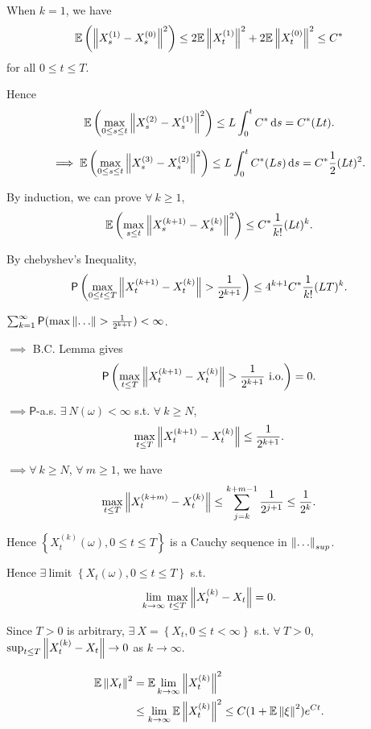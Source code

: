 {    When $k=1$, we have 
    $$
        \mathbb{E}\left( \left\|  X_s^{(1)} - X_s^{(0)}  \right\|^2 \right) \leq 2 \mathbb{E}\left\|  X_t^{(1)}  \right\|^2 + 2 \mathbb{E}\left\|  X_t^{(0)}  \right\|^2 \leq C^*
    $$
    for all $0 \leq t \leq T.$

    Hence 
    $$
    \mathbb{E}\left( \max_{0 \leq s \leq t} \left\|  X_s^{(2)} - X_s^{(1)}  \right\|^2 \right) \leq L\int_0^t C^* \mathop{}\!\mathrm{d} s = C^*(Lt).
    $$

    $$\implies
        \mathbb{E}\left( \max_{0 \leq s \leq t} \left\|  X_s^{(3)} - X_s^{(2)}  \right\|^2 \right) \leq L\int_0^t C^* (Ls) \mathop{}\!\mathrm{d} s = C^* \frac{1}{2}(Lt)^2.
    $$

    By induction, we can prove $\forall~ k \geq 1$,
    $$
    \mathbb{E}\left( \max_{s \leq t} \left\|  X_s^{(k+1)} - X_s^{(k)}  \right\|^2 \right) \leq C^* \frac{1}{k!} (Lt)^k.
    $$

    By chebyshev's Inequality,
    $$
    \mathsf{P}\left(\max_{0 \leq t \leq T} \left\|  X_t^{(k+1)} - X_t^{(k)}  \right\| > \frac{1}{2^{k+1}}\right) \leq 4^{k+1} C^* \frac{1}{k!} (LT)^k.
    $$

    $\sum_{k=1}^\infty \mathsf{P}(\max \norm{ \dots } > \frac{1}{2^{k+1}}) < \infty$.

    $\implies$ B.C. Lemma gives
    $$
    \mathsf{P}\left(\max_{t \leq T} \left\|  X_t^{(k+1)} - X_t^{(k)}  \right\| > \frac{1}{2^{k+1}}~\text{i.o.}\right) = 0.
    $$  

    $\implies \mathsf{P}$-a.s. $\exists~N(\omega)< \infty$ s.t. $\forall~ k \geq N$, 
    $$
        \max_{t \leq T} \left\|  X_t^{(k+1)} - X_t^{(k)}  \right\|\leq \frac{1}{2^{k+1}}.
    $$

    $\implies \forall~ k \geq N$, $\forall~ m \geq 1$, we have
    $$
    \max_{t \leq T} \left\|  X_t^{(k+m)} - X_t^{(k)}  \right\| \leq\sum_{j=k}^{k+m-1} \frac{1}{2^{j+1}} \leq \frac{1}{2^k}.
    $$
    
    Hence $\left\{ X_t^{(k)}(\omega),0 \leq t \leq T \right\}$ is a Cauchy sequence in $\norm{ \dots }_{sup}$.

    Hence $\exists~$limit $\left\{ X_t(\omega), 0 \leq t \leq T \right\}$ s.t. 
    $$
    \lim_{k\to \infty} \max_{t \leq T} \left\|  X_t^{(k)} - X_t  \right\| = 0.
    $$

    Since $T > 0$ is arbitrary, $\exists~X=\left\{ X_t,0 \leq t < \infty \right\}$ s.t. $\forall~ T > 0$, $\sup_{t \leq T}\left\|  X_t^{(k)} - X_t  \right\| \to 0 $ as $k \to \infty$. 

    $$
    \begin{aligned}
        \mathbb{E}\left\|  X_t  \right\|^2 &= \mathbb{E}\lim_{k \to \infty} \left\|  X_t^{(k)}  \right\|^2 \\
        &\leq \lim_{k \to \infty} \mathbb{E} \left\|  X_t^{(k)}  \right\|^2 \leq C(1+\mathbb{E}\left\|  \xi  \right\|^2) e^{Ct}.
    \end{aligned}
    $$

}

